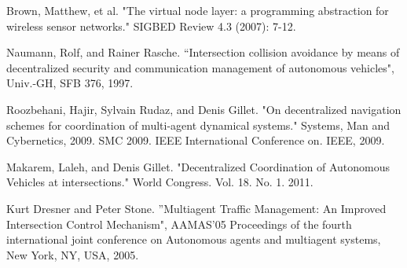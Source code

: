 \documentclass[12pt]{article}
\begin{document}
\begin{thebibliography}{9}

Brown, Matthew, et al. "The virtual node layer: a programming abstraction for wireless sensor networks." SIGBED Review 4.3 (2007): 7-12.

Naumann, Rolf, and Rainer Rasche. ``Intersection collision avoidance by means of decentralized security and communication management of autonomous vehicles", Univ.-GH, SFB 376, 1997.

Roozbehani, Hajir, Sylvain Rudaz, and Denis Gillet. "On decentralized navigation schemes for coordination of multi-agent dynamical systems." Systems, Man and Cybernetics, 2009. SMC 2009. IEEE International Conference on. IEEE, 2009.

Makarem, Laleh, and Denis Gillet. "Decentralized Coordination of Autonomous Vehicles at intersections." World Congress. Vol. 18. No. 1. 2011.

Kurt Dresner and Peter Stone. ''Multiagent Traffic Management: An Improved Intersection
Control Mechanism", AAMAS'05 Proceedings of the fourth international joint conference on Autonomous agents and multiagent systems, New York, NY, USA, 2005.
\end{thebibliography}
\end{document}
